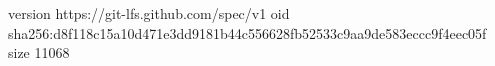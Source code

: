 version https://git-lfs.github.com/spec/v1
oid sha256:d8f118c15a10d471e3dd9181b44c556628fb52533c9aa9de583eccc9f4eec05f
size 11068
